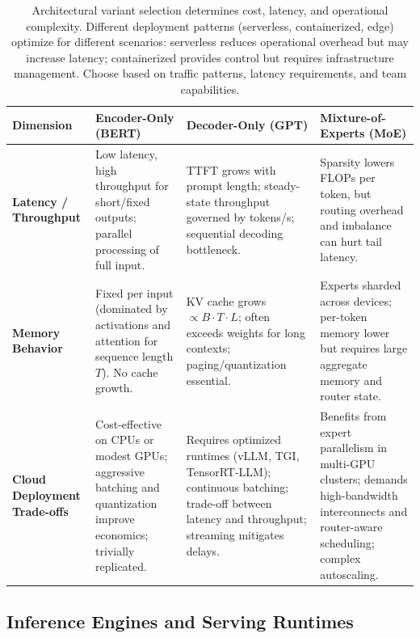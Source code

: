 \begin{table}[tb]
\centering
\small
\caption{Architectural variant selection determines cost, latency, and operational complexity. Different deployment patterns (serverless, containerized, edge) optimize for different scenarios: serverless reduces operational overhead but may increase latency; containerized provides control but requires infrastructure management. Choose based on traffic patterns, latency requirements, and team capabilities.}
\label{tab:ch07_arch_comparison}
\setlength{\tabcolsep}{6pt}
\renewcommand{\arraystretch}{1.3}
\begin{tabularx}{\linewidth}{@{}p{3.2cm}XXX@{}}
\toprule
\rowcolor{gray!15}
\textbf{Dimension} & \textbf{Encoder-Only (BERT)} & \textbf{Decoder-Only (GPT)} & \textbf{Mixture-of-Experts (MoE)} \\
\midrule
\textbf{Latency / Throughput} 
& Low latency, high throughput for short/fixed outputs; parallel processing of full input. 
& TTFT grows with prompt length; steady-state throughput governed by tokens/s; sequential decoding bottleneck. 
& Sparsity lowers FLOPs per token, but routing overhead and imbalance can hurt tail latency. \\
\midrule
\textbf{Memory Behavior} 
& Fixed per input (dominated by activations and attention for sequence length $T$). No cache growth. 
& KV cache grows $\propto B \cdot T \cdot L$; often exceeds weights for long contexts; paging/quantization essential. 
& Experts sharded across devices; per-token memory lower but requires large aggregate memory and router state. \\
\midrule
\textbf{Cloud Deployment Trade-offs} 
& Cost-effective on CPUs or modest GPUs; aggressive batching and quantization improve economics; trivially replicated. 
& Requires optimized runtimes (vLLM, TGI, TensorRT-LLM); continuous batching; trade-off between latency and throughput; streaming mitigates delays. 
& Benefits from expert parallelism in multi-GPU clusters; demands high-bandwidth interconnects and router-aware scheduling; complex autoscaling. \\
\bottomrule
\end{tabularx}
\end{table}


\subsection{Inference Engines and Serving Runtimes}
\label{sec:inference-engines}

